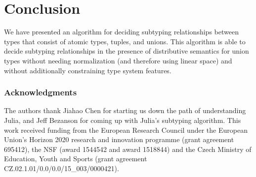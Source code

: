 \documentclass[a4paper,english]{lipics-v2019}
\begin{document}
\section{Conclusion}

We have presented an algorithm for deciding subtyping relationships between
types that consist of atomic types, tuples, and unions. This algorithm is able
to decide subtyping relationships in the presence of distributive semantics
for union types without needing normalization (and therefore using linear
space) and without additionally constraining type system features.

\subsubsection*{Acknowledgments}
The authors thank Jiahao Chen for starting us down the path of understanding
Julia, and Jeff Bezanson for coming up with Julia's subtyping algorithm.  This
work received funding from the European Research Council under the European
Union's Horizon 2020 research and innovation programme (grant agreement
695412), the NSF (award 1544542 and award 1518844) and the Czech Ministry of
Education, Youth and Sports (grant agreement
CZ.02.1.01/0.0/0.0/15\_003/0000421).
 

%

\end{document}
